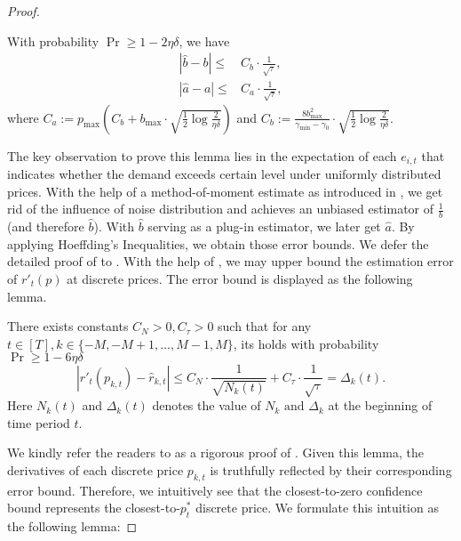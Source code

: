 \begin{proof}
\begin{lemma}
    \label{lemma:a_b_estimation_error}
    With probability $\Pr\geq 1-2\eta\delta$, we have
    \begin{equation}
        \label{equ:error_b_hat_and_a_hat}
        \begin{aligned}
            |\hat b - b| \leq& C_b\cdot\frac1{\sqrt{\tau}},\\
            |\hat a - a| \leq& C_a\cdot\frac1{\sqrt\tau},
        \end{aligned}
    \end{equation}
    where $C_a:=p_{\max}(C_b + b_{\max}\cdot\sqrt{\frac12\log\frac{2}{\eta\delta}})$ and $C_b:=\frac{8b_{\max}^2}{\gamma_{\min}-\gamma_0}\cdot\sqrt{\frac12\log\frac{2}{\eta\delta}}$.
\end{lemma}

The key observation to prove this lemma lies in the expectation of each $e_{i,t}$ that indicates whether the demand exceeds certain level under uniformly distributed prices. With the help of a method-of-moment estimate as introduced in , we get rid of the influence of noise distribution and achieves an unbiased estimator of $\frac1b$ (and therefore $\hat b$). With $\hat b$ serving as a plug-in estimator, we later get $\hat a$. By applying Hoeffding's Inequalities, we obtain those error bounds. We defer the detailed proof of  to . With the help of , we may upper bound the estimation error of $r'_t(p)$ at discrete prices. The error bound is displayed as the following lemma.

\begin{lemma}
    \label{lemma:r_derivative_estimation_error}
    There exists constants $C_N>0, C_{\tau}>0$ such that for any $t\in[T], k\in\{-M, -M+1, \ldots, M-1, M\}$, its holds with probability $\Pr\geq 1-6\eta\delta$
    \begin{equation}
        \label{eq:derivative_estimation_error}
        |r'_t(p_{k,t})-\hat r_{k,t}|\leq C_N\cdot\frac1{\sqrt{N_k(t)}} + C_\tau\cdot\frac1{\sqrt{\tau}} = \Delta_k(t).
    \end{equation}
    Here $N_k(t)$ and $\Delta_k(t)$ denotes the value of $N_k\text{ and }\Delta_k$ at the beginning of time period $t$.
\end{lemma}

We kindly refer the readers to  as a rigorous proof of . Given this lemma, the derivatives of each discrete price $p_{k,t}$ is truthfully reflected by their corresponding error bound. Therefore, we intuitively see that the closest-to-zero confidence bound represents the closest-to-$p_t^*$ discrete price. We formulate this intuition as the following lemma:


\end{proof}
